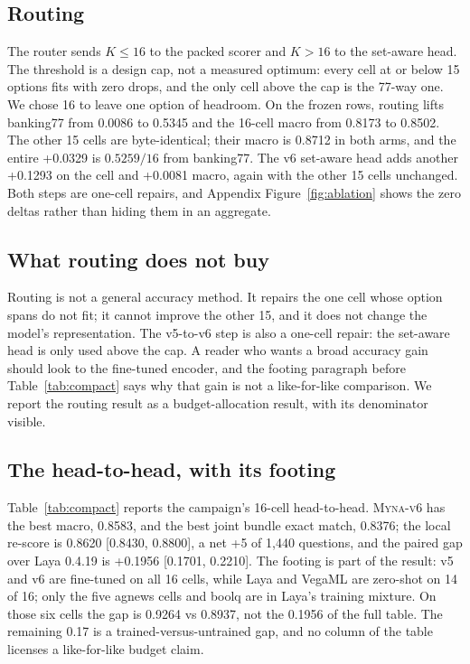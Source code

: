 \documentclass[11pt]{article}
\newcommand{\vsix}{\textsc{Myna-v6}}
\begin{document}
\subsection{Routing}
The router sends $K\le16$ to the packed scorer and $K>16$ to the set-aware head. The threshold is a design cap, not a measured optimum: every cell at or below 15 options fits with zero drops, and the only cell above the cap is the 77-way one. We chose 16 to leave one option of headroom. On the frozen rows, routing lifts banking77 from 0.0086 to 0.5345 and the 16-cell macro from 0.8173 to 0.8502. The other 15 cells are byte-identical; their macro is 0.8712 in both arms, and the entire +0.0329 is $0.5259/16$ from banking77. The v6 set-aware head adds another +0.1293 on the cell and +0.0081 macro, again with the other 15 cells unchanged. Both steps are one-cell repairs, and Appendix Figure~\ref{fig:ablation} shows the zero deltas rather than hiding them in an aggregate.

\subsection{What routing does not buy}
Routing is not a general accuracy method. It repairs the one cell whose option spans do not fit; it cannot improve the other 15, and it does not change the model's representation. The v5-to-v6 step is also a one-cell repair: the set-aware head is only used above the cap. A reader who wants a broad accuracy gain should look to the fine-tuned encoder, and the footing paragraph before Table~\ref{tab:compact} says why that gain is not a like-for-like comparison. We report the routing result as a budget-allocation result, with its denominator visible.

\subsection{The head-to-head, with its footing}
Table~\ref{tab:compact} reports the campaign's 16-cell head-to-head. \vsix{} has the best macro, 0.8583, and the best joint bundle exact match, 0.8376; the local re-score is 0.8620 [0.8430, 0.8800], a net +5 of 1{,}440 questions, and the paired gap over Laya 0.4.19 is +0.1956 [0.1701, 0.2210]. The footing is part of the result: v5 and v6 are fine-tuned on all 16 cells, while Laya and VegaML are zero-shot on 14 of 16; only the five agnews cells and boolq are in Laya's training mixture. On those six cells the gap is 0.9264 vs 0.8937, not the 0.1956 of the full table. The remaining 0.17 is a trained-versus-untrained gap, and no column of the table licenses a like-for-like budget claim.
\end{document}
